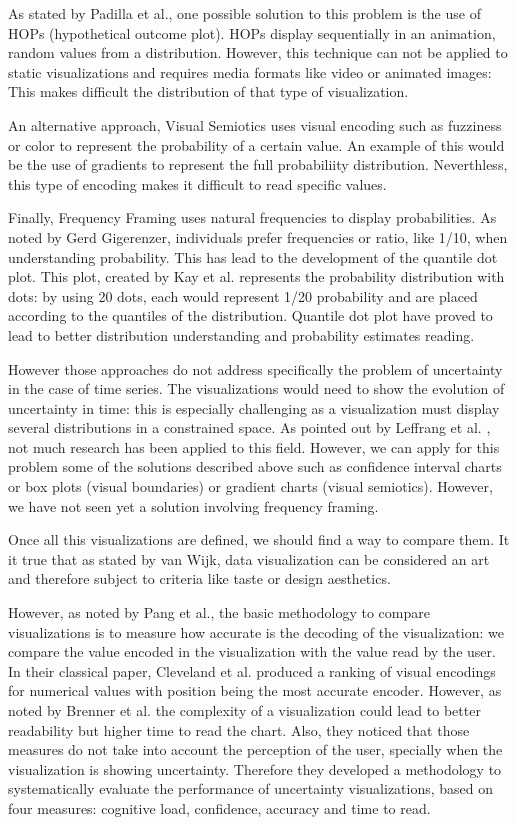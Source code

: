 \documentclass[a4paper,3p,sort&compress]{elsarticle}
\begin{document}
As stated by Padilla et al., one possible solution to this problem is the use of HOPs (hypothetical outcome plot). HOPs display 
sequentially in an animation, random values from a distribution. However, this technique can not be 
applied to static visualizations and requires media formats like video or animated images: This makes difficult the distribution 
of that type of visualization.

An alternative approach, Visual Semiotics uses visual encoding such as fuzziness or color to represent 
the probability of a certain value. An example of this would be the use of gradients to represent the 
full probabiliity distribution. Neverthless, this type of encoding makes it difficult to read specific 
values. 

Finally, Frequency Framing uses natural frequencies to display probabilities. As noted by Gerd 
Gigerenzer, individuals prefer frequencies or ratio, like 1/10, when understanding probability. This has 
lead to the development of the quantile dot plot. This plot, created by Kay et al. 
\cite{2016-when-ish-is-my-bus} 
represents 
the probability distribution with dots: by using 20 dots, each would represent 1/20 probability 
and are placed according 
to the quantiles of the distribution. Quantile dot plot have proved to lead to better distribution 
understanding and probability estimates reading. 

However those approaches do not address specifically the problem of uncertainty in the case of time series.
The visualizations would need to show the evolution of uncertainty in time: this 
is especially challenging as a visualization must display several distributions in a constrained space.  
As pointed out by Leffrang et al. \cite{leffrang_should_2021}, not much research has been applied to this 
field. 
However, we can apply for this problem some of the solutions described above such as confidence interval charts or 
box plots (visual boundaries) or gradient charts (visual semiotics). However, we have not seen yet a solution involving 
frequency framing. 

Once all this visualizations are defined, we should find a way to compare them. It it true that as stated by van Wijk,
data visualization can be considered an art and therefore subject to criteria like taste or design aesthetics.

However, as noted by Pang et al., the basic methodology to compare visualizations is to measure how accurate is the 
decoding of the visualization: we compare the value encoded in the visualization with the value read
by the user. In their classical paper, Cleveland et al. produced a ranking of visual encodings for numerical values 
with position being the most accurate encoder. However, as noted by Brenner et al. \cite{brennen_instrument_2018}
the complexity of a visualization could lead to better readability but higher time to read the chart. Also, 
they noticed that those measures do not take into account the perception of the user, specially when the visualization
is showing uncertainty. Therefore they developed a methodology 
to systematically evaluate the performance of uncertainty visualizations, based on four measures: 
cognitive load, confidence, accuracy and time to read. 
\end{document}
